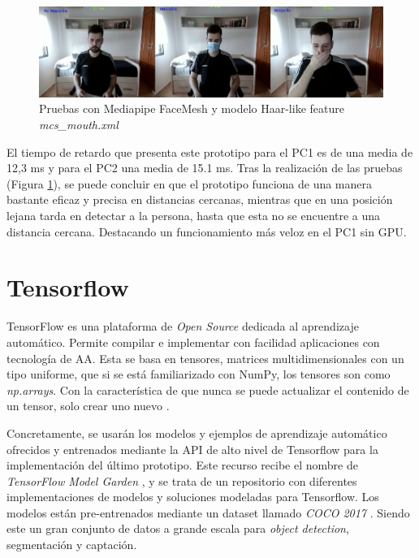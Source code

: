 \begin{figure}[htp]
	\centering
	\includegraphics[width=17cm]{imagenes/mediapipe_prueba.png}
	\caption{Pruebas con Mediapipe FaceMesh y modelo Haar-like feature \textit{mcs\_mouth.xml}}
	\label{fig:protoMediapipe}
\end{figure}

El tiempo de retardo que presenta este prototipo para el PC1 es de una media de 12,3 ms y para el PC2 una media de 15.1 ms. Tras la realización de las pruebas (Figura \ref{fig:protoMediapipe}), se puede concluir en que el prototipo funciona de una manera bastante eficaz y precisa en distancias cercanas, mientras que en una posición lejana tarda en detectar a la persona, hasta que esta no se encuentre a una distancia cercana. Destacando un funcionamiento más veloz en el PC1 sin GPU.

\newpage
\section{Tensorflow}

TensorFlow es una plataforma de \textit{Open Source} dedicada al aprendizaje automático. Permite compilar e implementar con facilidad aplicaciones con tecnología de AA. Esta se basa en tensores, matrices multidimensionales con un tipo uniforme, que si se está familiarizado con NumPy, los tensores son como \textit{np.arrays}. Con la característica de que nunca se puede actualizar el contenido de un tensor, solo crear uno nuevo \cite{tensorflow}.

Concretamente, se usarán los modelos y ejemplos de aprendizaje automático ofrecidos y entrenados mediante la API de alto nivel de Tensorflow para la implementación del último prototipo. Este recurso recibe el nombre de \textit{TensorFlow Model Garden} \cite{modelGarden}, y se trata de un repositorio con diferentes implementaciones de modelos y soluciones modeladas para Tensorflow. Los modelos están pre-entrenados mediante un dataset llamado \textit{COCO 2017} \cite{coco}. Siendo este un gran conjunto de datos a grande escala para \textit{object detection}, segmentación y captación.

